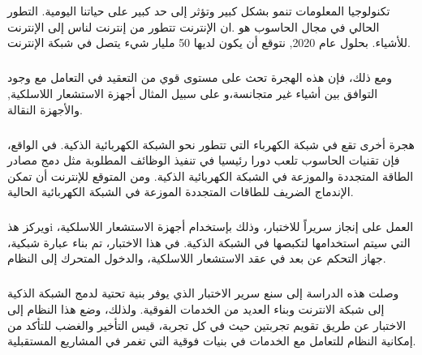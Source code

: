 \documentclass[oneside,12pt,a4paper,final]{book}
\begin{document}
\chapter*{}
\paragraph{}
\begin{arabtex}
تكنولوجيا المعلومات تنمو بشكل كبير وتؤثر إلى حد كبير على حياتنا اليومية. التطور الحالي في مجال الحاسوب هو  .ان الإنترنت تتطور من إنترنت لناس إلى الإنترنت  للأشياء. بحلول عام 2020, نتوقع أن يكون لديها 50 مليار شيء يتصل في شبكة الإنترنت.
\end{arabtex}
\paragraph{}
\begin{arabtex}
ومع ذلك، فإن هذه الهجرة تحث على مستوى قوي من التعقيد في التعامل مع وجود التوافق بين أشياء غير متجانسة،و على سبيل المثال أجهزة الاستشعار اللاسلكية, والأجهزة النقالة.
\end{arabtex}
\paragraph{}
\begin{arabtex}
هجرة أخرى تقع في شبكة الكهرباء التي تتطور نحو الشبكة الكهربائية الذكية. في الواقع، فإن تقنيات الحاسوب تلعب دورا رئيسيا في تنفيذ الوظائف المطلوبة مثل دمج مصادر الطاقة المتجددة والموزعة في الشبكة الكهربائية الذكية. ومن المتوقع للإنترنت أن تمكن الإندماج الضريف للطاقات المتجددة الموزعة في الشبكة الكهربائية الحالية.
\end{arabtex}
\paragraph{}
\begin{arabtex}
ويركز هذi العمل على إنجاز سريراً للاختبار، وذلك بإستخدام أجهزة الاستشعار اللاسلكية، التي سيتم استخدامها لتكبصها في الشبكة الذكية. في هذا الاختبار، تم بناء عبارة شبكية، جهاز التحكم عن بعد في عقد الاستشعار اللاسلكية، والدخول المتحرك إلى النظام.
\end{arabtex}
\paragraph{}
\begin{arabtex}
وصلت هذه الدراسة إلى سنع سرير الاختبار الذي يوفر بنية تحتية لدمج الشبكة الذكية إلى شبكة الانترنت وبناء العديد من الخدمات الفوقية. ولذلك، وضع هذا النظام إلى الاختبار عن طريق تقويم تجربتين حيث في كل تجربة، قيس التأخير والغضب للتأكد من إمكانية النظام للتعامل مع الخدمات في بنيات فوقية التي تغمر في المشاريع المستقبلية.
\end{arabtex}
\singlespacing
\end{document}
